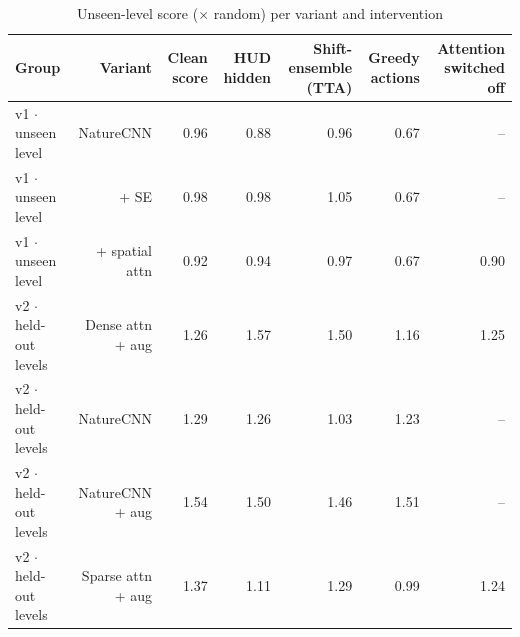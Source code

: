 \begin{table}[t]
\centering
\caption{Unseen-level score ($\times$ random) per variant and intervention}
\label{tab:test_time_interventions_by_variant}
\begin{tabular}{lrrrrrr}
\toprule
Group & Variant & Clean score & HUD hidden & Shift-ensemble (TTA) & Greedy actions & Attention switched off \\
\midrule
v1 $\cdot$ unseen level & NatureCNN & 0.96 & 0.88 & 0.96 & 0.67 & -- \\
v1 $\cdot$ unseen level & + SE & 0.98 & 0.98 & 1.05 & 0.67 & -- \\
v1 $\cdot$ unseen level & + spatial attn & 0.92 & 0.94 & 0.97 & 0.67 & 0.90 \\
v2 $\cdot$ held-out levels & Dense attn + aug & 1.26 & 1.57 & 1.50 & 1.16 & 1.25 \\
v2 $\cdot$ held-out levels & NatureCNN & 1.29 & 1.26 & 1.03 & 1.23 & -- \\
v2 $\cdot$ held-out levels & NatureCNN + aug & 1.54 & 1.50 & 1.46 & 1.51 & -- \\
v2 $\cdot$ held-out levels & Sparse attn + aug & 1.37 & 1.11 & 1.29 & 0.99 & 1.24 \\
\bottomrule
\end{tabular}
\end{table}
